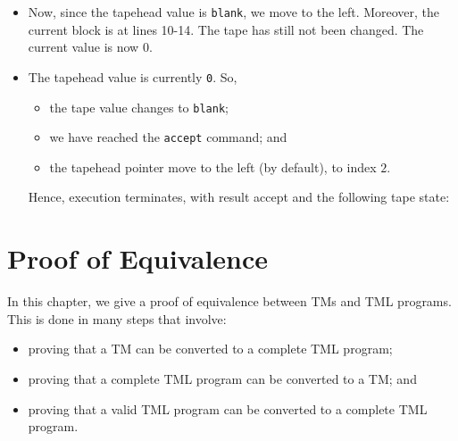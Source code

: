 \begin{appendices}
\begin{itemize}
    \item Now, since the tapehead value is \texttt{blank}, we move to the left. Moreover, the current block is at lines 10-14. The tape has still not been changed. The current value is now $0$.

    \item The tapehead value is currently \texttt{0}. So,  
    \begin{itemize}
        \item the tape value changes to \texttt{blank};
        \item we have reached the \texttt{accept} command; and
        \item the tapehead pointer move to the left (by default), to index $2$.
    \end{itemize}
    Hence, execution terminates, with result accept and the following tape state:
    \begin{figure}[H]
        \centering
    \end{figure}
\end{itemize}

\chapter{Proof of Equivalence}
In this chapter, we give a proof of equivalence between TMs and TML programs. This is done in many steps that involve:
\begin{itemize}
    \item proving that a TM can be converted to a complete TML program;
    \item proving that a complete TML program can be converted to a TM; and
    \item proving that a valid TML program can be converted to a complete TML program.
\end{itemize}


\end{appendices}
